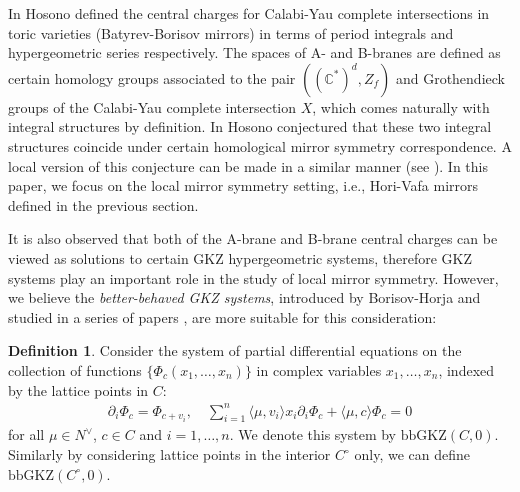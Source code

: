 \documentclass[11pt,reqno]{amsart}
\def\CC {{\mathbb C}}
\theoremstyle{definition}
\newtheorem{definition}[theorem]{Definition}
\numberwithin{equation}{section}
\begin{document}
\smallskip

In \cite{Hosono} Hosono defined the central charges for Calabi-Yau complete intersections in toric varieties (Batyrev-Borisov mirrors) in terms of period integrals and hypergeometric series respectively. The spaces of A- and B-branes are defined as certain homology groups associated to the pair $((\CC^*)^d, Z_f)$ and Grothendieck groups of the Calabi-Yau complete intersection $X$, which comes naturally with integral structures by definition. In \cite[Conjecture 2.2]{Hosono} Hosono conjectured that these two integral structures coincide under certain homological mirror symmetry correspondence. A local version of this conjecture can be made in a similar manner (see \cite[Conjecture 6.3]{Hosono}). In this paper, we focus on the local mirror symmetry setting, i.e., Hori-Vafa mirrors defined in the previous section.


\smallskip


It is also observed that both of the A-brane and B-brane central charges can be viewed as solutions to certain GKZ hypergeometric systems, therefore GKZ systems play an important role in the study of local mirror symmetry. However, we believe the \textit{better-behaved GKZ systems}, introduced by Borisov-Horja \cite{BH} and studied in a series of papers \cite{BHconj, BHW, BHanDuality, bbGKZ_analytic_continuation}, are more suitable for this consideration:
\begin{definition}\label{defGKZ}
	Consider the system of partial differential equations on the collection of functions $\{\Phi_c(x_1,\ldots,x_n)\}$ in complex variables $x_1,\ldots, x_n$, indexed by the lattice points in $C$:
	\begin{align*}
		\partial_i\Phi_c=\Phi_{c+v_i},\quad \sum_{i=1}^n\langle\mu,v_i\rangle x_i\partial_i\Phi_c+\langle\mu,c\rangle\Phi_c=0
	\end{align*}
for all $\mu\in N^{\vee}$, $c\in C$ and $i=1,\ldots,n$. We denote this system by $\mathrm{bbGKZ}(C,0)$. Similarly by considering lattice points in the interior $C^{\circ}$ only, we can define $\mathrm{bbGKZ}(C^{\circ},0)$.
\end{definition}
\end{document}
